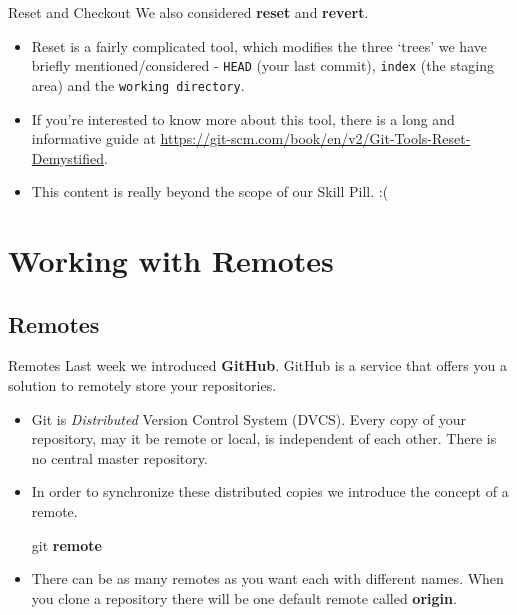 \documentclass{beamer}
\begin{document}
\begin{frame}{Reset and Checkout}
  We also considered \textbf{reset} and \textbf{revert}.
  \begin{itemize}
    \item Reset is a fairly complicated tool, which modifies the three \lq{}trees\rq{} we have briefly mentioned/considered - \texttt{HEAD} (your last commit), \texttt{index} (the staging area) and the \texttt{working directory}.
    \item If you\rq{}re interested to know more about this tool, there is a long and informative guide at \url{https://git-scm.com/book/en/v2/Git-Tools-Reset-Demystified}.
    \item This content is really beyond the scope of our Skill Pill. :(
  \end{itemize}
\end{frame}


\section{Working with Remotes}
\subsection{Remotes}
\begin{frame}{Remotes}
Last week we introduced \textbf{GitHub}. GitHub is a service that offers you a solution to remotely store your repositories.
\begin{itemize}
    \item Git is \emph{Distributed} Version Control System (DVCS). Every copy of your repository, may it be remote or local, is independent of each other. There is no central master repository. 
    \item In order to synchronize these distributed copies we introduce the concept of a remote.
  \begin{block}{}
    git \textbf{remote}
  \end{block}
  \item There can be as many remotes as you want each with different names. When you clone a repository there will be one default remote called \textbf{origin}.
\end{itemize}
\end{frame}
\end{document}
